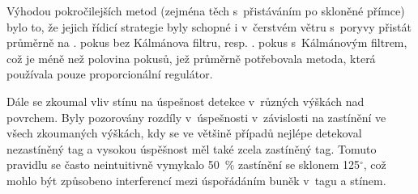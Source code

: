 Výhodou pokročilejších metod (zejména těch s~přistáváním po skloněné přímce) bylo to, že jejich řídicí strategie byly schopné i v~čerstvém větru s~poryvy přistát průměrně na \landingRetriesMeanLAPILvitrIV. pokus bez Kálmánova filtru, resp. \landingRetriesMeanKAPILvitrIV. pokus s~Kálmánovým filtrem, což je méně než polovina pokusů, jež průměrně potřebovala metoda, která používala pouze proporcionální regulátor.

Dále se zkoumal vliv stínu na úspešnost detekce v~různých výškách nad povrchem. Byly pozorovány rozdíly v~úspešnosti v~závislosti na zastínění ve všech zkoumaných výškách, kdy se ve většině případů nejlépe detekoval nezastíněný tag a vysokou úspěšnost měl také zcela zastíněný tag. Tomuto pravidlu se často neintuitivně vymykalo 50~\% zastínění se sklonem 125$^\circ$, což mohlo být způsobeno interferencí mezi úspořádáním buněk v~tagu a stínem.
